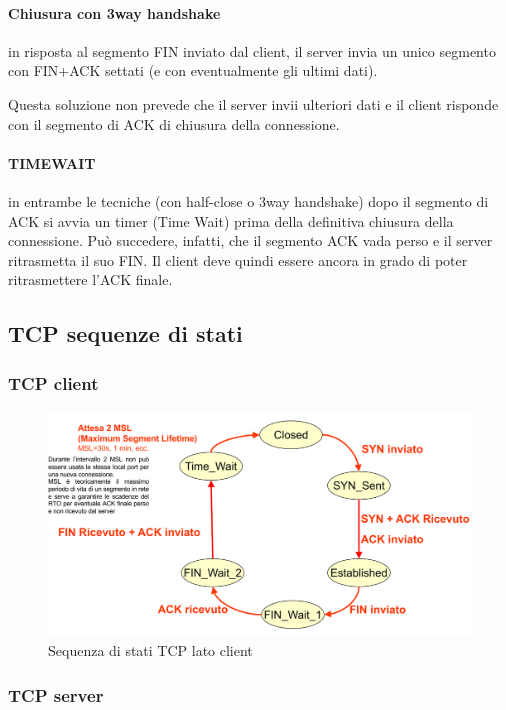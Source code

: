 \newpage
\paragraph{Chiusura con 3way handshake}

in risposta al segmento FIN inviato
dal client, il server invia un unico segmento con
FIN+ACK settati (e con eventualmente gli ultimi
dati).

Questa soluzione non prevede che il server invii
ulteriori dati e il client risponde con il segmento di ACK di
chiusura della connessione.



\paragraph{TIMEWAIT}
in entrambe le tecniche (con
half-close o 3way handshake) dopo il segmento
di ACK si avvia un timer (Time Wait) prima della
definitiva chiusura della connessione. Può
succedere, infatti, che il segmento ACK vada
perso e il server ritrasmetta il suo FIN. Il client
deve quindi essere ancora in grado di poter
ritrasmettere l'ACK finale.
\newpage
\subsection{TCP sequenze di stati}
\subsubsection{TCP client}
\begin{figure}[h!]
    \centering
    \includegraphics[width=1.1\textwidth]{images/tcpstaticlient.png}
    \caption{Sequenza di stati TCP lato client}
    \label{fig:tcpstaticlient}
\end{figure}
\subsubsection{TCP server}

